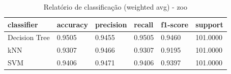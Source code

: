 \begin{table}[htbp]
\centering
\begin{tabular}{llllll}
\hline
classifier & accuracy & precision & recall & f1-score & support \\
\hline
Decision Tree & 0.9505 & 0.9455 & 0.9505 & 0.9460 & 101.0000 \\
kNN & 0.9307 & 0.9466 & 0.9307 & 0.9195 & 101.0000 \\
SVM & 0.9406 & 0.9471 & 0.9406 & 0.9397 & 101.0000 \\
\hline
\end{tabular}
\caption{Relatório de classificação (weighted avg) - zoo}
\label{tab:ex3-zoo-classification-report}
\end{table}